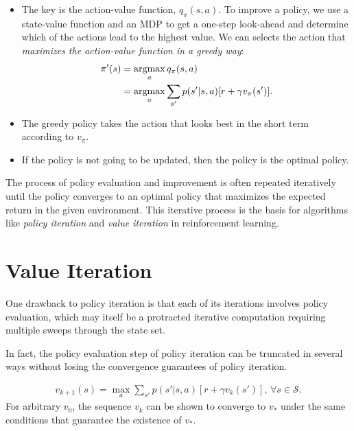 \begin{itemize}
	\item The key is the action-value function, $q_\pi(s,a)$. To improve a policy, we use a state-value function and an MDP to get a one-step look-ahead and determine which of the actions lead to the highest value. We can selects the action that \textit{maximizes the action-value function in a greedy way}: 
		\begin{align*}
			\pi'(s) &= \operatorname*{\operatorname{argmax}}_a q_\pi(s,a)\\
			&= \operatorname*{\operatorname{argmax}}_a \sum_{s'}p(s'|s,a)[r + \gamma v_\pi(s')].
		\end{align*}
	\item The greedy policy takes the action that looks best in the short term according to $v_\pi$.
	\item If the policy is not going to be updated, then the policy is the optimal policy.
\end{itemize}

The process of policy evaluation and improvement is often repeated iteratively until the policy converges to an optimal policy that maximizes the expected return in the given environment. This iterative process is the basis for algorithms like \textit{policy iteration} and \textit{value iteration} in reinforcement learning.


\section{Value Iteration}
One drawback to policy iteration is that each of its iterations involves policy evaluation, which may itself be a protracted iterative computation requiring multiple sweeps through the state set.

In fact, the policy evaluation step of policy iteration can be truncated in several ways without losing the convergence guarantees of policy iteration.

\begin{align}
	v_{k+1}(s)=\max_a \sum_{s'}p(s'|s,a)[r + \gamma v_k(s')], \, \forall s\in \mathcal{S}.
	\label{eq:value_iteration}
\end{align}
For arbitrary $v_0$, the sequence $v_k$ can be shown to converge to $v_*$ under the same conditions that guarantee the existence of $v_*$.

